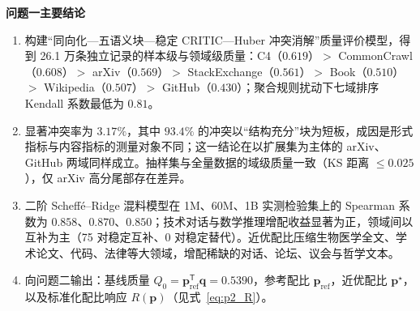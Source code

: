 \begin{conclusionbox}
\textbf{问题一主要结论}
\begin{enumerate}
\item 构建“同向化—五语义块—稳定 CRITIC—Huber 冲突消解”质量评价模型，得到 26.1 万条独立记录的样本级与领域级质量：C4（$0.619$）$>$ CommonCrawl（$0.608$）$>$ arXiv（$0.569$）$>$ StackExchange（$0.561$）$>$ Book（$0.510$）$>$ Wikipedia（$0.507$）$>$ GitHub（$0.430$）；聚合规则扰动下七域排序 Kendall 系数最低为 $0.81$。
\item 显著冲突率为 $3.17\%$，其中 $93.4\%$ 的冲突以“结构充分”块为短板，成因是形式指标与内容指标的测量对象不同；这一结论在以扩展集为主体的 arXiv、GitHub 两域同样成立。抽样集与全量数据的域级质量一致（KS 距离 $\le0.025$），仅 arXiv 高分尾部存在差异。
\item 二阶 Scheff\'e--Ridge 混料模型在 1M、60M、1B 实测检验集上的 Spearman 系数为 $0.858$、$0.870$、$0.850$；技术对话与数学推理增配收益显著为正，领域间以互补为主（75 对稳定互补、0 对稳定替代）。近优配比压缩生物医学全文、学术论文、代码、法律等大领域，增配稀缺的对话、论坛、议会与哲学文本。
\item 向问题二输出：基线质量 $Q_0=\boldsymbol p_{\mathrm{ref}}^{\mathsf T}\boldsymbol q=0.5390$，参考配比 $\boldsymbol p_{\mathrm{ref}}$，近优配比 $\boldsymbol p^\star$，以及标准化配比响应 $R(\boldsymbol p)$（见式~\eqref{eq:p2_R}）。
\end{enumerate}
\end{conclusionbox}

